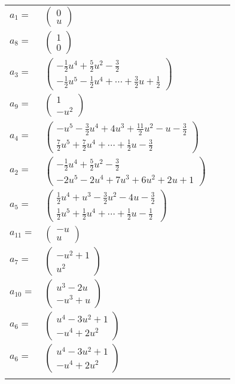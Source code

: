 \documentclass[1p]{elsarticle_modified}
\theoremstyle{definition}
\begin{document}
\begin{tabular}{m{7pt} m{180pt} m{7pt} m{180pt} }
\flushright $a_{1}=$&$\begin{pmatrix}0\\u\end{pmatrix}$ \\
\flushright $a_{8}=$&$\begin{pmatrix}1\\0\end{pmatrix}$ \\
\flushright $a_{3}=$&$\begin{pmatrix}-\frac{1}{2} u^4+\frac{5}{2} u^2-\frac{3}{2}\\-\frac{1}{2} u^5-\frac{1}{2} u^4+\cdots+\frac{3}{2} u+\frac{1}{2}\end{pmatrix}$ \\
\flushright $a_{9}=$&$\begin{pmatrix}1\\- u^2\end{pmatrix}$ \\
\flushright $a_{4}=$&$\begin{pmatrix}- u^5-\frac{3}{2} u^4+4 u^3+\frac{11}{2} u^2- u-\frac{3}{2}\\\frac{7}{2} u^5+\frac{7}{2} u^4+\cdots+\frac{1}{2} u-\frac{3}{2}\end{pmatrix}$ \\
\flushright $a_{2}=$&$\begin{pmatrix}-\frac{1}{2} u^4+\frac{5}{2} u^2-\frac{3}{2}\\-2 u^5-2 u^4+7 u^3+6 u^2+2 u+1\end{pmatrix}$ \\
\flushright $a_{5}=$&$\begin{pmatrix}\frac{1}{2} u^4+u^3-\frac{3}{2} u^2-4 u-\frac{3}{2}\\\frac{1}{2} u^5+\frac{1}{2} u^4+\cdots+\frac{1}{2} u-\frac{1}{2}\end{pmatrix}$ \\
\flushright $a_{11}=$&$\begin{pmatrix}- u\\u\end{pmatrix}$ \\
\flushright $a_{7}=$&$\begin{pmatrix}- u^2+1\\u^2\end{pmatrix}$ \\
\flushright $a_{10}=$&$\begin{pmatrix}u^3-2 u\\- u^3+u\end{pmatrix}$ \\
\flushright $a_{6}=$&$\begin{pmatrix}u^4-3 u^2+1\\- u^4+2 u^2\end{pmatrix}$\\ \flushright $a_{6}=$&$\begin{pmatrix}u^4-3 u^2+1\\- u^4+2 u^2\end{pmatrix}$\\&\end{tabular}
\end{document}

